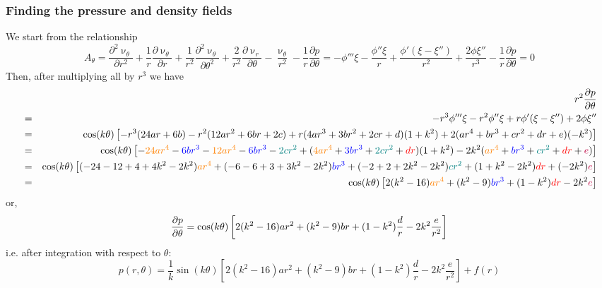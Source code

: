 \subsubsection*{Finding the pressure and density fields}
We start from the relationship
\[
A_\theta=
\frac{\partial^2 \upnu_\theta}{\partial r^2} + \frac{1}{r} \frac{\partial \upnu_\theta}{\partial r} + \frac{1}{r^2} \frac{\partial^2 \upnu_\theta}{\partial \theta^2}
+\frac{2}{r^2} \frac{\partial \upnu_r}{\partial \theta} - \frac{\upnu_\theta}{r^2} 
-\frac{1}{r}\frac{\partial p}{\partial \theta} 
=
- \phi''' \xi 
- \frac{\phi'' \xi}{r} 
+ \frac{\phi' (\xi -\xi'')}{r^2} 
+\frac{2 \phi \xi''}{r^3} 
-\frac{1}{r}\frac{\partial p}{\partial \theta} 
= 0 
\]
Then, after multiplying all by $r^3$ we have
\begin{eqnarray}
&&r^2\frac{\partial p}{\partial \theta}\\
&=&- r^3\phi''' \xi 
- r^2 \phi'' \xi
+ r \phi' (\xi -\xi'') 
+ 2 \phi \xi''
\\
&=& \cos(k\theta) 
\left[ - r^3(24 ar + 6b )
- r^2 (12 ar^2 + 6 br + 2c)  
+ r (4ar^3+3br^2 +2cr + d ) (1 +k^2 )
+ 2 ( ar^4+br^3+cr^2+dr+e) (-k^2  ) \right]\\
&=& \cos(k\theta) \left[  
-{\color{orange}24 ar^4} - {\color{blue}6br^3} 
-  {\color{orange}12 ar^4} - {\color{blue}6 br^3} 
- {\color{teal} 2cr^2 }
+  ({\color{orange}4ar^4}+{\color{blue}3br^3} + {\color{teal}2cr^2} + {\color{red}dr} )(1+k^2)
- 2k^2({\color{orange}ar^4}+ {\color{blue}br^3}+{\color{teal}cr^2}
+{\color{red}dr}+{\color{purple}e})
\right] \nonumber\\
&=&  \cos(k\theta) \left[
(-24-12+4+4k^2-2k^2) {\color{orange} ar^4}
+(-6-6+3+3k^2-2k^2) {\color{blue}br^3}
+(-2+2+2k^2-2k^2) {\color{teal}cr^2}
+(1+k^2-2k^2) {\color{red}dr}
+(-2k^2){\color{purple}e}
\right] \nonumber\\
&=& \cos(k\theta) \left[
2(k^2-16){\color{orange} ar^4}
+(k^2-9){\color{blue}br^3}
+(1-k^2){\color{red}dr}
-2k^2{\color{purple}e}
\right]
\end{eqnarray}
or, 
\[
\frac{\partial p}{\partial \theta}\\
= \cos(k\theta) 
\left[
2(k^2-16)ar^2
+(k^2-9)br
+(1-k^2)\frac{d}{r}
-2k^2\frac{e}{r^2}
\right]
\]
i.e. after integration with respect to $\theta$:
\[
p(r,\theta) = 
\frac{1}{k}\sin(k\theta) 
\left[
2(k^2-16)ar^2
+(k^2-9)br
+(1-k^2)\frac{d}{r}
-2k^2\frac{e}{r^2}
\right]
+f(r)
\]
